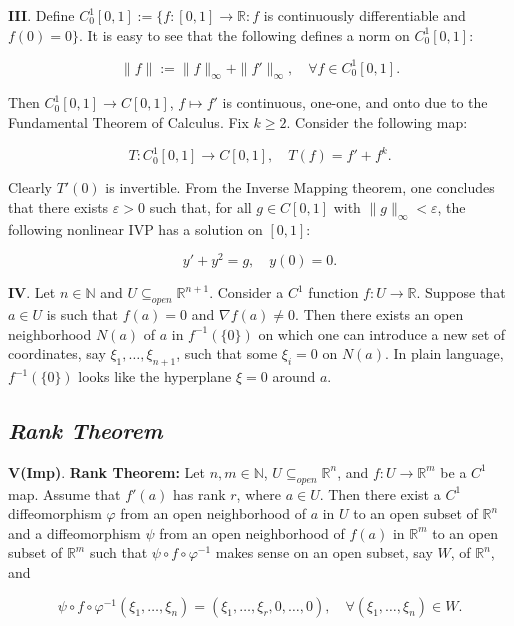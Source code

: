 \documentclass{book}
\begin{document}
\textbf{III}. Define $C_0^1[0, 1] := \{ f : [0, 1] \to \mathbb{R} : f$ is continuously differentiable and $f(0) = 0 \}$. It is easy to see that the following defines a norm on $C_0^1[0, 1]$:

\[
\|f\| := \|f\|_\infty + \|f'\|_\infty, \quad \forall f \in C_0^1[0, 1].
\]

Then $C_0^1[0, 1] \to C[0, 1]$, $f \mapsto f'$ is continuous, one-one, and onto due to the Fundamental Theorem of Calculus. Fix $k \geq 2$. Consider the following map:

\[
T : C_0^1[0, 1] \to C[0, 1], \quad T(f) = f' + f^k.
\]

Clearly $T'(0)$ is invertible. From the Inverse Mapping theorem, one concludes that there exists $\varepsilon > 0$ such that, for all $g \in C[0, 1]$ with $\|g\|_\infty < \varepsilon$, the following nonlinear IVP has a solution on $[0, 1]$:

\[
y' + y^2 = g, \quad y(0) = 0.
\]

\textbf{IV}. Let $n \in \mathbb{N}$ and $U \subseteq_{open} \mathbb{R}^{n+1}$. Consider a $C^1$ function $f : U \to \mathbb{R}$. Suppose that $a \in U$ is such that $f(a) = 0$ and $\nabla f(a) \neq 0$. Then there exists an open neighborhood $N(a)$ of $a$ in $f^{-1}(\{0\})$ on which one can introduce a new set of coordinates, say $\xi_1, \ldots, \xi_{n+1}$, such that some $\xi_i = 0$ on $N(a)$. In plain language, $f^{-1}(\{0\})$ looks like the hyperplane $\xi = 0$ around $a$.

\begin{center}
    
\section*{\textbf{\textit{Rank Theorem}}}
\end{center}

\textbf{V(Imp)}. \textbf{Rank Theorem:} Let $n, m \in \mathbb{N}$, $U \subseteq_{open} \mathbb{R}^n$, and $f : U \to \mathbb{R}^m$ be a $C^1$ map. Assume that $f'(a)$ has rank $r$, where $a \in U$. Then there exist a $C^1$ diffeomorphism $\varphi$ from an open neighborhood of $a$ in $U$ to an open subset of $\mathbb{R}^n$ and a diffeomorphism $\psi$ from an open neighborhood of $f(a)$ in $\mathbb{R}^m$ to an open subset of $\mathbb{R}^m$ such that $\psi \circ f \circ \varphi^{-1}$ makes sense on an open subset, say $W$, of $\mathbb{R}^n$, and

\[
\psi \circ f \circ \varphi^{-1} (\xi_1, \ldots, \xi_n) = (\xi_1, \ldots, \xi_r, 0, \ldots, 0), \quad \forall (\xi_1, \ldots, \xi_n) \in W.
\]
\end{document}
